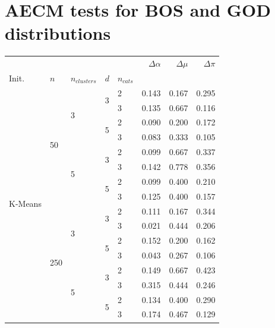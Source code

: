 \documentclass[a4paper,12pt]{article}
\begin{document}
\appendix

\section{AECM tests for BOS and GOD distributions}
\label{appendix:metrics_synth}

\begin{table}[H]
\centering
\begin{minipage}{.48\columnwidth}
\centering
\begin{adjustbox}{width=\columnwidth}
\begin{tabular}{lllllrrr}
\toprule
 &  &  &  &  & $\Delta \alpha$ & $\Delta \mu$ & $\Delta \pi$ \\
Init. & $n$ & $n_{clusters}$ & $d$ & $n_{cats}$ &  &  &  \\
\midrule
\multirow[t]{16}{*}{K-Means} & \multirow[t]{8}{*}{50} & \multirow[t]{4}{*}{3} & \multirow[t]{2}{*}{3} & 2 & 0.143 & 0.167 & 0.295 \\
 &  &  &  & 3 & 0.135 & 0.667 & 0.116 \\
\cline{4-8}
 &  &  & \multirow[t]{2}{*}{5} & 2 & 0.090 & 0.200 & 0.172 \\
 &  &  &  & 3 & 0.083 & 0.333 & 0.105 \\
\cline{3-8} \cline{4-8}
 &  & \multirow[t]{4}{*}{5} & \multirow[t]{2}{*}{3} & 2 & 0.099 & 0.667 & 0.337 \\
 &  &  &  & 3 & 0.142 & 0.778 & 0.356 \\
\cline{4-8}
 &  &  & \multirow[t]{2}{*}{5} & 2 & 0.099 & 0.400 & 0.210 \\
 &  &  &  & 3 & 0.125 & 0.400 & 0.157 \\
\cline{2-8} \cline{3-8} \cline{4-8}
 & \multirow[t]{8}{*}{250} & \multirow[t]{4}{*}{3} & \multirow[t]{2}{*}{3} & 2 & 0.111 & 0.167 & 0.344 \\
 &  &  &  & 3 & 0.021 & 0.444 & 0.206 \\
\cline{4-8}
 &  &  & \multirow[t]{2}{*}{5} & 2 & 0.152 & 0.200 & 0.162 \\
 &  &  &  & 3 & 0.043 & 0.267 & 0.106 \\
\cline{3-8} \cline{4-8}
 &  & \multirow[t]{4}{*}{5} & \multirow[t]{2}{*}{3} & 2 & 0.149 & 0.667 & 0.423 \\
 &  &  &  & 3 & 0.315 & 0.444 & 0.246 \\
\cline{4-8}
 &  &  & \multirow[t]{2}{*}{5} & 2 & 0.134 & 0.400 & 0.290 \\
 &  &  &  & 3 & 0.174 & 0.467 & 0.129 \\

\end{tabular}
\end{adjustbox}
\end{minipage}
\end{table}
\end{document}
